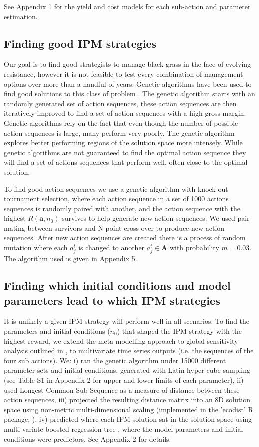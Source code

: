\documentclass[9pt,twocolumn,twoside,lineno]{pnas-new}
\begin{document}
{See Appendix 1 for the yield and cost models for each sub-action and parameter estimation.

\subsection*{Finding good IPM strategies} 
Our goal is to find good strategists to manage black grass in the face of evolving resistance, however it is not feasible to test every combination of management options over more than a handful of years. Genetic algorithms have been used to find good solutions to this class of problem \citep{Tayl2004GA, Carr2010}. The genetic algorithm starts with an randomly generated set of action sequences, these action sequences are then iteratively improved to find a set of action sequences with a high gross margin. Genetic algorithms rely on the fact that even though the number of possible action sequences is large, many perform very poorly. The genetic algorithm explores better performing regions of the solution space more intensely. While genetic algorithms are not guaranteed to find the optimal action sequence they will find a set of actions sequences that perform well, often close to the optimal solution.   

To find good action sequences we use a genetic algorithm with knock out tournament selection, where each action sequence in a set of 1000 actions sequences is randomly paired with another, and the action sequence with the highest $R(\mathbf{a}, n_0)$ survives to help generate new action sequences. We used pair mating between survivors and N-point cross-over to produce new action sequences. After new action sequences are created there is a process of random mutation where each $a_j^t$ is changed to another $a_j^t \in \mathbf{A}$ with probability $m = 0.03$. The algorithm used is given in Appendix 5.        

\subsection*{Finding which initial conditions and model parameters lead to which IPM strategies}
It is unlikely a given IPM strategy will perform well in all scenarios. To find the parameters and initial conditions ($n_0$) that shaped the IPM strategy with the highest reward, we extend the meta-modelling approach to global sensitivity analysis outlined in \citet{Cout2014}, to multivariate time series outputs (i.e. the sequences of the four sub actions). We: i) ran the genetic algorithm under 15000 different parameter sets and initial conditions, generated with Latin hyper-cube sampling (see Table S1 in Appendix 2 for upper and lower limits of each parameter), ii) used Longest Common Sub-Sequence \citep{Tooh2015} as a measure of distance between these action sequences, iii) projected the resulting distance matrix into an 8D solution space using non-metric multi-dimensional scaling (implemented in the 'ecodist' R package; \citealt{Gosl2007}), iv) predicted where each IPM solution sat in the solution space using multi-variate boosted regression tree \citep{Mill2016}, where the model parameters and initial conditions were predictors. See Appendix 2 for details.

}
\end{document}
